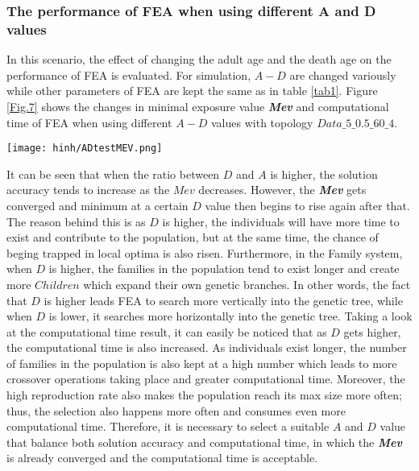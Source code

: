 \documentclass[final]{elsarticle}
\begin{document}
\subsubsection{The performance of FEA when using different A and D values}
In this scenario, the effect of changing the adult age and the death age on the performance of FEA is evaluated. For simulation, $A - D$ are changed variously while other parameters of FEA are kept the same as in table \ref{tab1}. Figure \ref{Fig.7} shows the changes in minimal exposure value \textit{\textbf{Mev}} and computational time of FEA when using different $A-D$ values with topology $Data\_5\_0.5\_60\_4$.
\begin{figure*}[h]
	\texttt{[image: hinh/ADtestMEV.png]}
	\centering
	\caption{The minimal exposure value when using different A-D values
	}
	\label{Fig.7}       %
\end{figure*}

It can be seen that when the ratio between $D$ and $A$ is higher, the solution accuracy tends to increase as the $Mev$ decreases. However, the \textit{\textbf{Mev}} gets converged and minimum at a certain $D$ value then begins to rise again after that. The reason behind this is as $D$ is higher, the individuals will have more time to exist and contribute to the population, but at the same time, the chance of beging trapped in local optima is also risen. Furthermore, in the Family system, when $D$ is higher, the families in the population tend to exist longer and create more $Children $ which expand their own genetic branches. In other words, the fact that $D$ is higher leads FEA to search more vertically into the genetic tree, while when $D$ is lower, it searches more horizontally into the genetic tree. Taking a look at the computational time result, it can easily be noticed that as $D$ gets higher, the computational time is also increased. As individuals exist longer, the number of families in the population is also kept at a high number which leads to more crossover operations taking place and greater computational time. Moreover, the high reproduction rate also makes the population reach its max size more often; thus, the selection also happens more often and consumes even more computational time. Therefore, it is necessary to select a suitable $A$ and $D$ value that balance both solution accuracy and computational time, in which the \textbf{\textit{Mev}} is already converged and the computational time is acceptable.  
\end{document}
